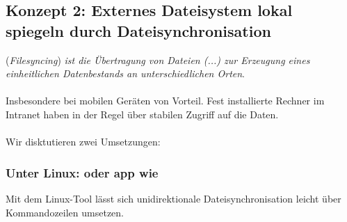 \subsection{Konzept 2: Externes Dateisystem lokal spiegeln durch Dateisynchronisation}
 (\textit{Filesyncing}) \textit{ist die Übertragung von Dateien (...) zur Erzeugung eines einheitlichen Datenbestands an unterschiedlichen Orten}.\\
~\\
Insbesondere bei mobilen Geräten von Vorteil. Fest installierte Rechner im Intranet haben in der Regel über  stabilen Zugriff auf die Daten.\\
~\\
Wir disktutieren zwei Umsetzungen:
\subsubsection{Unter Linux:  oder app wie }
Mit dem Linux-Tool  lässt sich unidirektionale Dateisynchronisation leicht über Kommandozeilen umsetzen.
